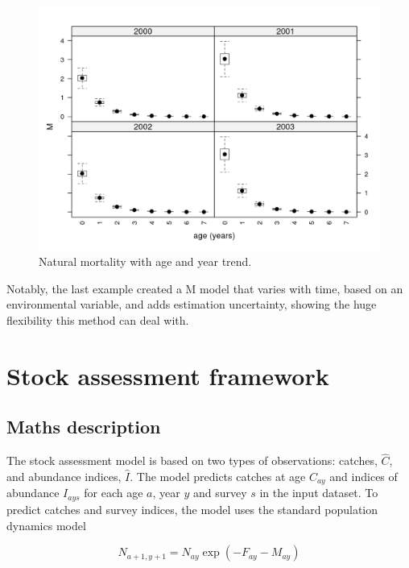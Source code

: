 \documentclass[
]{book}
\begin{document}
\begin{figure}
\centering
\includegraphics{_bookdown_files/_main_files/figure-html/uncertainm-1.png}
\caption{\label{fig:uncertainm}Natural mortality with age and year trend.}
\end{figure}

Notably, the last example created a M model that varies with time, based on an environmental variable, and adds estimation uncertainty, showing the huge flexibility this method can deal with.

\hypertarget{stock-assessment-framework}{%
\chapter{Stock assessment framework}\label{stock-assessment-framework}}

\hypertarget{maths-description}{%
\section{\texorpdfstring{Maths description \label{sec:math}}{Maths description }}\label{maths-description}}

The stock assessment model is based on two types of observations: catches, \(\hat{C}\), and abundance indices, \(\hat{I}\). The model predicts catches at age \(C_{ay}\) and indices of abundance \(I_{ays}\) for each age \(a\), year \(y\) and survey \(s\) in the input dataset. To predict catches and survey indices, the model uses the standard population dynamics model

\begin{equation}
N_{a+1,y+1} = N_{ay} \exp \left( - F_{ay} - M_{ay} \right)
\end{equation}
\end{document}
